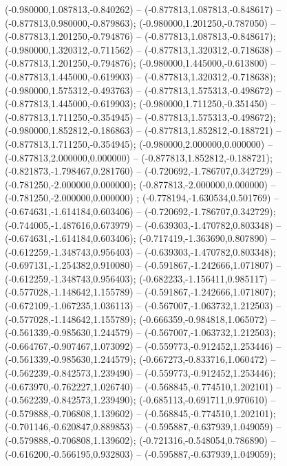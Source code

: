  (-0.980000,1.087813,-0.840262) -- (-0.877813,1.087813,-0.848617) -- (-0.877813,0.980000,-0.879863);
 (-0.980000,1.201250,-0.787050) -- (-0.877813,1.201250,-0.794876) -- (-0.877813,1.087813,-0.848617);
 (-0.980000,1.320312,-0.711562) -- (-0.877813,1.320312,-0.718638) -- (-0.877813,1.201250,-0.794876);
 (-0.980000,1.445000,-0.613800) -- (-0.877813,1.445000,-0.619903) -- (-0.877813,1.320312,-0.718638);
 (-0.980000,1.575312,-0.493763) -- (-0.877813,1.575313,-0.498672) -- (-0.877813,1.445000,-0.619903);
 (-0.980000,1.711250,-0.351450) -- (-0.877813,1.711250,-0.354945) -- (-0.877813,1.575313,-0.498672);
 (-0.980000,1.852812,-0.186863) -- (-0.877813,1.852812,-0.188721) -- (-0.877813,1.711250,-0.354945);
 (-0.980000,2.000000,0.000000) -- (-0.877813,2.000000,0.000000) -- (-0.877813,1.852812,-0.188721);
 (-0.821873,-1.798467,0.281760) -- (-0.720692,-1.786707,0.342729) -- (-0.781250,-2.000000,0.000000);
 (-0.877813,-2.000000,0.000000) -- (-0.781250,-2.000000,0.000000) ;
 (-0.778194,-1.630534,0.501769) -- (-0.674631,-1.614184,0.603406) -- (-0.720692,-1.786707,0.342729);
 (-0.744005,-1.487616,0.673979) -- (-0.639303,-1.470782,0.803348) -- (-0.674631,-1.614184,0.603406);
 (-0.717419,-1.363690,0.807890) -- (-0.612259,-1.348743,0.956403) -- (-0.639303,-1.470782,0.803348);
 (-0.697131,-1.254382,0.910080) -- (-0.591867,-1.242666,1.071807) -- (-0.612259,-1.348743,0.956403);
 (-0.682233,-1.156411,0.985117) -- (-0.577028,-1.148642,1.155789) -- (-0.591867,-1.242666,1.071807);
 (-0.672109,-1.067235,1.036113) -- (-0.567007,-1.063732,1.212503) -- (-0.577028,-1.148642,1.155789);
 (-0.666359,-0.984818,1.065072) -- (-0.561339,-0.985630,1.244579) -- (-0.567007,-1.063732,1.212503);
 (-0.664767,-0.907467,1.073092) -- (-0.559773,-0.912452,1.253446) -- (-0.561339,-0.985630,1.244579);
 (-0.667273,-0.833716,1.060472) -- (-0.562239,-0.842573,1.239490) -- (-0.559773,-0.912452,1.253446);
 (-0.673970,-0.762227,1.026740) -- (-0.568845,-0.774510,1.202101) -- (-0.562239,-0.842573,1.239490);
 (-0.685113,-0.691711,0.970610) -- (-0.579888,-0.706808,1.139602) -- (-0.568845,-0.774510,1.202101);
 (-0.701146,-0.620847,0.889853) -- (-0.595887,-0.637939,1.049059) -- (-0.579888,-0.706808,1.139602);
 (-0.721316,-0.548054,0.786890) -- (-0.616200,-0.566195,0.932803) -- (-0.595887,-0.637939,1.049059);
